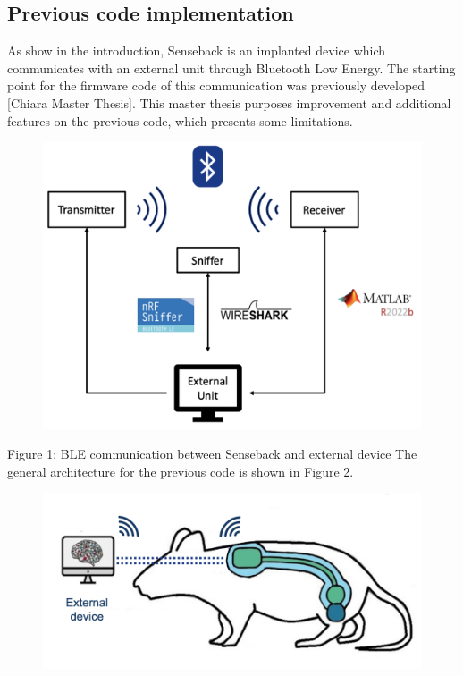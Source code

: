 \documentclass{Configuration_Files/PoliMi3i_thesis}
\begin{document}
\subsection{Previous code implementation}



As show in the introduction, Senseback is an implanted device which communicates with an external unit through Bluetooth Low Energy. The starting point for the firmware code of this communication was previously developed [Chiara Master Thesis]. This master thesis purposes improvement and additional features on the previous code, which presents some limitations.

\begin{figure}[H]
	\includegraphics[scale=0.3]{prev1.png}
	\centering
\end{figure}

Figure 1: BLE communication between Senseback and external device
The general architecture for the previous code is shown in Figure 2.

\begin{figure}[H]
	\includegraphics[scale=0.3]{prev2.png}
	\centering
\end{figure}
\end{document}

